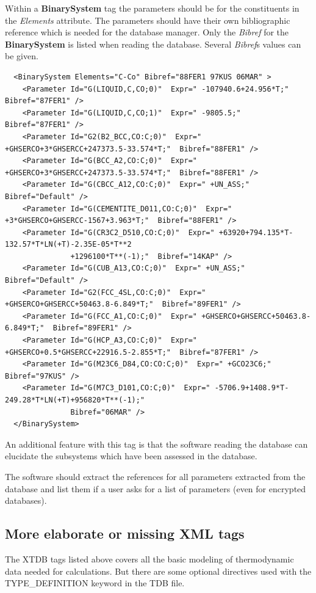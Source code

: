 \documentclass{article}
\begin{document}
\bigskip
Within a {\bf BinarySystem} tag the parameters should be for the
constituents in the {\em Elements} attribute.  The parameters should
have their own bibliographic reference which is needed for the
database manager.  Only the {\em Bibref} for the {\bf BinarySystem} is
listed when reading the database.  Several {\em Bibref}s values can be
given.

{\begin{verbatim}
  <BinarySystem Elements="C-Co" Bibref="88FER1 97KUS 06MAR" >
    <Parameter Id="G(LIQUID,C,CO;0)"  Expr=" -107940.6+24.956*T;"  Bibref="87FER1" />
    <Parameter Id="G(LIQUID,C,CO;1)"  Expr=" -9805.5;"  Bibref="87FER1" />
    <Parameter Id="G2(B2_BCC,CO:C;0)"  Expr=" +GHSERCO+3*GHSERCC+247373.5-33.574*T;"  Bibref="88FER1" />
    <Parameter Id="G(BCC_A2,CO:C;0)"  Expr=" +GHSERCO+3*GHSERCC+247373.5-33.574*T;"  Bibref="88FER1" />
    <Parameter Id="G(CBCC_A12,CO:C;0)"  Expr=" +UN_ASS;"  Bibref="Default" />
    <Parameter Id="G(CEMENTITE_D011,CO:C;0)"  Expr=" +3*GHSERCO+GHSERCC-1567+3.963*T;"  Bibref="88FER1" />
    <Parameter Id="G(CR3C2_D510,CO:C;0)"  Expr=" +63920+794.135*T-132.57*T*LN(+T)-2.35E-05*T**2
               +1296100*T**(-1);"  Bibref="14KAP" />
    <Parameter Id="G(CUB_A13,CO:C;0)"  Expr=" +UN_ASS;"  Bibref="Default" />
    <Parameter Id="G2(FCC_4SL,CO:C;0)"  Expr=" +GHSERCO+GHSERCC+50463.8-6.849*T;"  Bibref="89FER1" />
    <Parameter Id="G(FCC_A1,CO:C;0)"  Expr=" +GHSERCO+GHSERCC+50463.8-6.849*T;"  Bibref="89FER1" />
    <Parameter Id="G(HCP_A3,CO:C;0)"  Expr=" +GHSERCO+0.5*GHSERCC+22916.5-2.855*T;"  Bibref="87FER1" />
    <Parameter Id="G(M23C6_D84,CO:CO:C;0)"  Expr=" +GCO23C6;"  Bibref="97KUS" />
    <Parameter Id="G(M7C3_D101,CO:C;0)"  Expr=" -5706.9+1408.9*T-249.28*T*LN(+T)+956820*T**(-1);"
               Bibref="06MAR" />
  </BinarySystem>
\end{verbatim}
}

An additional feature with this tag is that the software reading the
database can elucidate the subsystems which have been assessed in the
database.

The software should extract the references for all parameters
extracted from the database and list them if a user asks for a list of
parameters (even for encrypted databases).

\subsection{More elaborate or missing XML tags}

The XTDB tags listed above covers all the basic modeling of
thermodynamic data needed for calculations.  But there are some
optional directives used with the TYPE\_DEFINITION keyword in the TDB
file.
\end{document}
